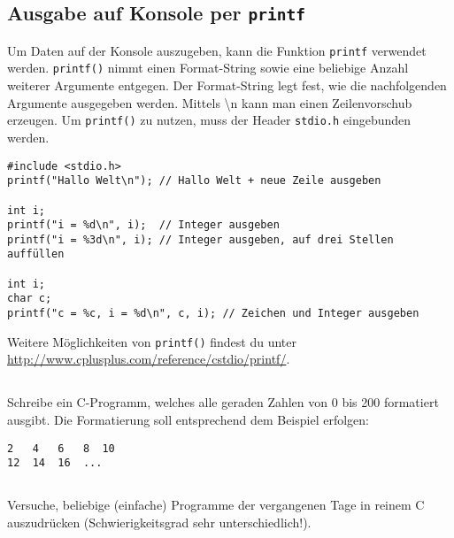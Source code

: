 \subsection{Ausgabe auf Konsole per \texttt{printf}}

Um Daten auf der Konsole auszugeben, kann die Funktion \texttt{printf} verwendet werden.
\texttt{printf()} nimmt einen Format-String sowie eine beliebige Anzahl weiterer Argumente entgegen.
Der Format-String legt fest, wie die nachfolgenden Argumente ausgegeben werden.
Mittels \textbackslash n kann man einen Zeilenvorschub erzeugen. Um \texttt{printf()} zu nutzen, muss der Header \texttt{stdio.h} eingebunden werden.

\begin{lstlisting}
#include <stdio.h>
printf("Hallo Welt\n"); // Hallo Welt + neue Zeile ausgeben

int i;
printf("i = %d\n", i);  // Integer ausgeben
printf("i = %3d\n", i); // Integer ausgeben, auf drei Stellen auffüllen

int i;
char c;
printf("c = %c, i = %d\n", c, i); // Zeichen und Integer ausgeben
\end{lstlisting}

Weitere Möglichkeiten von \texttt{printf()} findest du unter \url{http://www.cplusplus.com/reference/cstdio/printf/}.

\subsection{}
Schreibe ein C-Programm, welches alle geraden Zahlen von 0 bis 200 formatiert ausgibt.
Die Formatierung soll entsprechend dem Beispiel erfolgen:

\begin{lstlisting}
2   4   6   8  10
12  14  16  ...
\end{lstlisting}

\subsection{}
Versuche, beliebige (einfache) Programme der vergangenen Tage in reinem C auszudrücken (Schwierigkeitsgrad sehr unterschiedlich!).
